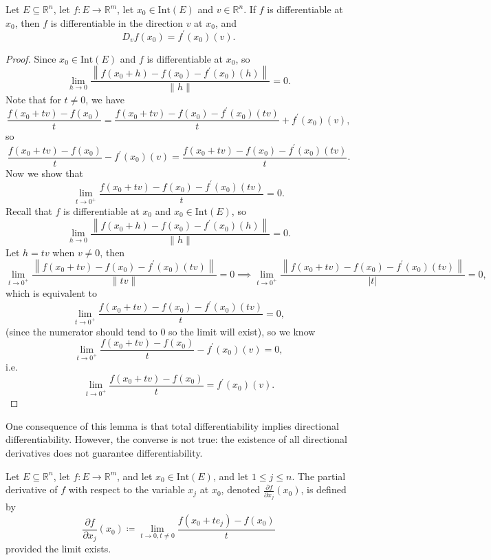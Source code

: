 \begin{lemma} \label{lm: directional derivative another form}
    Let \(E \subseteq \mathbb{R} ^n\), let \(f : E \to \mathbb{R} ^m\), let \(x_0 \in \mathrm{Int}(E) \) and \(v \in \mathbb{R} ^n\). If \(f\) is differentiable at \(x_0\), then \(f\) is differentiable in the direction \(v\) at \(x_0\), and 
    \[
        D_v f(x_0) = f^{\prime} (x_0)(v).
    \]         
\end{lemma}
\begin{proof}
    Since \(x_0 \in \mathrm{Int}(E) \) and \(f\) is differentiable at \(x_0\), so 
    \[
        \lim_{h \to 0} \frac{\left\lVert f(x_0 + h) - f(x_0) - f^{\prime} (x_0) (h) \right\rVert }{\lVert h \rVert } = 0. 
    \]   
    Note that for \(t \neq 0\), we have 
    \[
        \frac{f(x_0 + tv) - f(x_0)}{t} = \frac{f(x_0 + tv) - f(x_0) - f^{\prime} (x_0)(tv)}{t} + f^{\prime} (x_0)(v),
    \] 
    so 
    \[
       \frac{f(x_0 + tv) - f(x_0)}{t} - f^{\prime} (x_0)(v) = \frac{f(x_0 + tv) - f(x_0) - f^{\prime} (x_0)(tv)}{t}. 
    \]
    Now we show that 
    \[
        \lim_{t \to 0^+} \frac{f(x_0 + tv) - f(x_0) - f^{\prime} (x_0)(tv)}{t} = 0. 
    \]
    Recall that \(f\) is differentiable at \(x_0\) and \(x_0 \in \mathrm{Int}(E) \), so 
    \[
        \lim_{h \to 0} \frac{\left\lVert f(x_0 + h) - f(x_0) - f^{\prime} (x_0)(h) \right\rVert }{\lVert h \rVert } = 0. 
    \]  
    Let \(h = tv\) when \(v \neq 0\), then 
    \[
        \lim_{t \to 0^+} \frac{\left\lVert f(x_0 + tv) - f(x_0) - f^{\prime} (x_0)(tv) \right\rVert }{\lVert tv \rVert } = 0 \implies \lim_{t \to 0^+} \frac{\left\lVert f(x_0 + tv) - f(x_0) - f^{\prime} (x_0)(tv) \right\rVert }{\vert t \vert  } = 0, 
    \]   
    which is equivalent to 
    \[
        \lim_{t \to 0^+} \frac{f(x_0 + tv) - f(x_0) - f^{\prime} (x_0) (tv)}{t} = 0, 
    \]
    (since the numerator should tend to \(0\) so the limit will exist), so we know 
    \[
        \lim_{t \to 0^+} \frac{f(x_0 + tv) - f(x_0)}{t} - f^{\prime} (x_0)(v) = 0, 
    \]
    i.e. 
    \[
       \lim_{t \to 0^+} \frac{f(x_0 + tv) - f(x_0)}{t} = f^{\prime} (x_0)(v). 
    \]
\end{proof}

\begin{remark}
    One consequence of this lemma is that total differentiability implies directional differentiability. However, the converse is not true: the existence of all directional derivatives does not guarantee differentiability.
\end{remark}

\begin{definition}
    Let \(E \subseteq \mathbb{R} ^n\), let \(f: E \to \mathbb{R} ^m\), and let \(x_0 \in \mathrm{Int}(E) \), and let \(1 \le j \le n\). The partial derivative of \(f\) with respect to the variable \(x_j\) at \(x_0\), denoted \(\frac{\partial f}{\partial x_j}(x_0) \), is defined by 
    \[
       \frac{\partial f}{\partial x_j}(x_0) \coloneqq \lim_{t \to 0, t \neq 0} \frac{f(x_0 + t e_j) - f(x_0)}{t}
    \]        
    provided the limit exists.
\end{definition}

